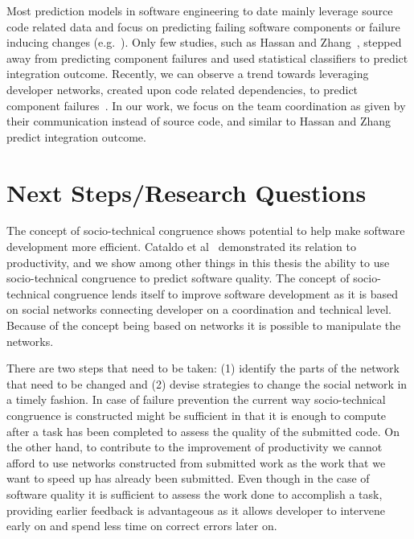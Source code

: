 Most prediction models in software engineering to date mainly leverage source
code related data and focus on predicting failing software components or failure
inducing changes
(e.g.~\cite{bell:2005tse,schroeter:isese:2006,zimmermann:icse:2008,kim:2008tse}).
Only few studies, such as Hassan and Zhang~\cite{hassan:ase:2006}, stepped away
from predicting component failures and used statistical classifiers to predict
integration outcome. Recently, we can observe a trend towards leveraging
developer networks, created upon code related dependencies, to predict component
failures~\cite{pinzger:fse:2008,meneely:fse:2008}. In our work, we focus on the
team coordination as given by their communication instead of source code, and
similar to Hassan and Zhang predict integration outcome.


\section{Next Steps/Research Questions}
The concept of socio-technical congruence shows potential to help make software development more efficient.
Cataldo et al~\cite{cataldo:cscw:2006} demonstrated its relation to productivity, and we show among other things in this thesis the ability to use socio-technical congruence to predict software quality.
The concept of socio-technical congruence lends itself to improve software development as it is based on social networks connecting developer on a coordination and technical level.
Because of the concept being based on networks it is possible to manipulate the networks.

There are two steps that need to be taken:
(1) identify the parts of the network that need to be changed
and (2) devise strategies to change the social network in a timely fashion.
In case of failure prevention the current way socio-technical congruence is constructed might be sufficient in that it is enough to compute after a task has been completed to assess the quality of the submitted code.
On the other hand, to contribute to the improvement of productivity we cannot afford to use networks constructed from submitted work as the work that we want to speed up has already been submitted.
Even though in the case of software quality it is sufficient to assess the work done to accomplish a task, providing earlier feedback is advantageous as it allows developer to intervene early on and spend less time on correct errors later on.

